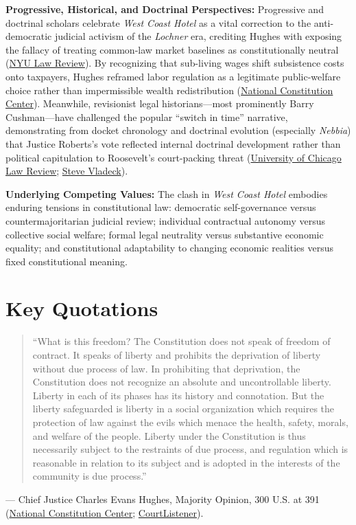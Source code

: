 \documentclass[12pt]{article}
\begin{document}
\textbf{Progressive, Historical, and Doctrinal Perspectives:} Progressive and doctrinal scholars celebrate \textit{West Coast Hotel} as a vital correction to the anti-democratic judicial activism of the \textit{Lochner} era, crediting Hughes with exposing the fallacy of treating common-law market baselines as constitutionally neutral (\href{https://www.nyulawreview.org/wp-content/uploads/2018/08/NYULawReview-76-5-Friedman.pdf}{NYU Law Review}). By recognizing that sub-living wages shift subsistence costs onto taxpayers, Hughes reframed labor regulation as a legitimate public-welfare choice rather than impermissible wealth redistribution (\href{https://constitutioncenter.org/the-constitution/supreme-court-case-library/west-coast-hotel-co-v-parrish}{National Constitution Center}). Meanwhile, revisionist legal historians---most prominently Barry Cushman---have challenged the popular ``switch in time'' narrative, demonstrating from docket chronology and doctrinal evolution (especially \textit{Nebbia}) that Justice Roberts's vote reflected internal doctrinal development rather than political capitulation to Roosevelt's court-packing threat (\href{https://chicagounbound.uchicago.edu/cgi/viewcontent.cgi?article=5058&context=uclrev}{University of Chicago Law Review}; \href{https://www.stevevladeck.com/p/42-the-switch-in-time-that-saved}{Steve Vladeck}).

\textbf{Underlying Competing Values:} The clash in \textit{West Coast Hotel} embodies enduring tensions in constitutional law: democratic self-governance versus countermajoritarian judicial review; individual contractual autonomy versus collective social welfare; formal legal neutrality versus substantive economic equality; and constitutional adaptability to changing economic realities versus fixed constitutional meaning.

\section{Key Quotations}

\begin{quote}
``What is this freedom? The Constitution does not speak of freedom of contract. It speaks of liberty and prohibits the deprivation of liberty without due process of law. In prohibiting that deprivation, the Constitution does not recognize an absolute and uncontrollable liberty. Liberty in each of its phases has its history and connotation. But the liberty safeguarded is liberty in a social organization which requires the protection of law against the evils which menace the health, safety, morals, and welfare of the people. Liberty under the Constitution is thus necessarily subject to the restraints of due process, and regulation which is reasonable in relation to its subject and is adopted in the interests of the community is due process.''
\end{quote}
\noindent --- Chief Justice Charles Evans Hughes, Majority Opinion, 300 U.S. at 391 (\href{https://constitutioncenter.org/the-constitution/supreme-court-case-library/west-coast-hotel-co-v-parrish}{National Constitution Center}; \href{https://www.courtlistener.com/opinion/102784/west-coast-hotel-co-v-parrish/}{CourtListener}).
\end{document}

